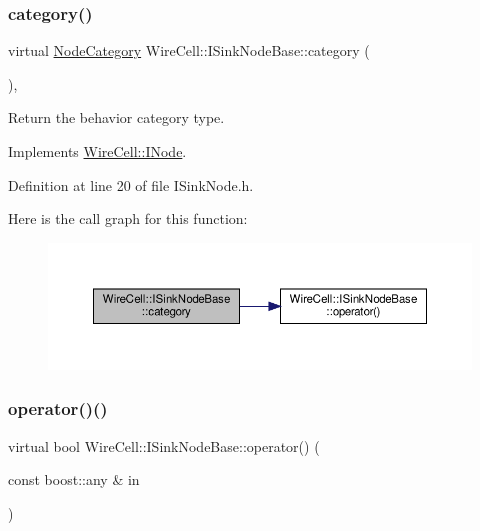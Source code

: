 \subsubsection{\texorpdfstring{category()}{category()}}
{\footnotesize\ttfamily virtual \hyperlink{class_wire_cell_1_1_i_node_a5546e64cbb70bd3ac787295cac9ac803}{Node\+Category} Wire\+Cell\+::\+I\+Sink\+Node\+Base\+::category (\begin{DoxyParamCaption}{ }\end{DoxyParamCaption})\hspace{0.3cm}{\ttfamily [inline]}, {\ttfamily [virtual]}}



Return the behavior category type. 



Implements \hyperlink{class_wire_cell_1_1_i_node_a58c07f15b165e5fb33bbc7b2e047b39b}{Wire\+Cell\+::\+I\+Node}.



Definition at line 20 of file I\+Sink\+Node.\+h.

Here is the call graph for this function\+:
\nopagebreak
\begin{figure}[H]
\begin{center}
\leavevmode
\includegraphics[width=350pt]{class_wire_cell_1_1_i_sink_node_base_aed8e3945184e47177abf0b16c74e6aff_cgraph}
\end{center}
\end{figure}
\mbox{\label{class_wire_cell_1_1_i_sink_node_base_a449038481c2f511bcfa7c7bf77641069}} 
\subsubsection{\texorpdfstring{operator()()}{operator()()}}
{\footnotesize\ttfamily virtual bool Wire\+Cell\+::\+I\+Sink\+Node\+Base\+::operator() (\begin{DoxyParamCaption}\item[{const boost\+::any \&}]{in }\end{DoxyParamCaption})\hspace{0.3cm}{\ttfamily [pure virtual]}}



